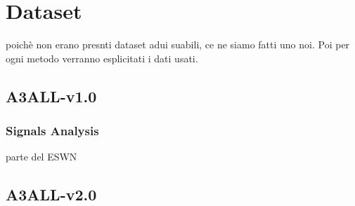 \chapter{Dataset}
poichè non erano presnti dataset adui suabili, ce ne siamo fatti uno noi. Poi per ogni metodo verranno esplicitati i dati usati.
\section{A3ALL-v1.0}
\subsection{Signals Analysis}
parte del ESWN
\section{A3ALL-v2.0}